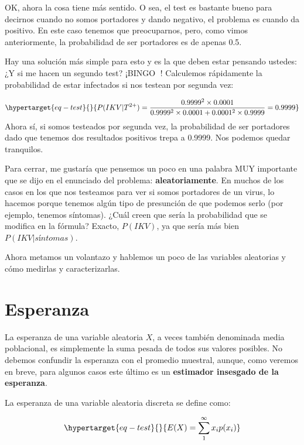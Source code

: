 \documentclass[
  letterpaper,
  DIV=11,
  numbers=noendperiod,
  oneside]{scrreprt}
\begin{document}
OK, ahora la cosa tiene más sentido. O sea, el test es bastante bueno
para decirnos cuando no somos portadores y dando negativo, el problema
es cuando da positivo. En este caso tenemos que preocuparnos, pero, como
vimos anteriormente, la probabilidad de ser portadores es de apenas 0.5.

Hay una solución más simple para esto y es la que deben estar pensando
ustedes: ¿Y si me hacen un segundo test? ¡BINGO 🎊! Calculemos
rápidamente la probabilidad de estar infectados si nos testean por
segunda vez:

\begin{equation}\protect\hypertarget{eq-test}{}{
P(IKV|T^{2+}) = \frac{0.9999^2 \times 0.0001}{0.9999^2 \times 0.0001 + 0.0001^2 \times 0.9999} = 0.9999
}\label{eq-test}\end{equation} Ahora sí, si somos testeados por segunda
vez, la probabilidad de ser portadores dado que tenemos dos resultados
positivos trepa a 0.9999. Nos podemos quedar tranquilos.

Para cerrar, me gustaría que pensemos un poco en una palabra MUY
importante que se dijo en el enunciado del problema:
\textbf{aleatoriamente}. En muchos de los casos en los que nos testeamos
para ver si somos portadores de un virus, lo hacemos porque tenemos
algún tipo de presunción de que podemos serlo (por ejemplo, tenemos
síntomas). ¿Cuál creen que sería la probabilidad que se modifica en la
fórmula? Exacto, \(P(IKV)\), ya que sería más bien \(P(IKV|síntomas)\).

Ahora metamos un volantazo y hablemos un poco de las variables
aleatorias y cómo medirlas y caracterizarlas.

\hypertarget{esperanza}{%
\section{Esperanza}\label{esperanza}}

La esperanza de una variable aleatoria \(X\), a veces también denominada
media poblacional, es simplemente la suma pesada de todos sus valores
posibles. No debemos confundir la esperanza con el promedio muestral,
aunque, como veremos en breve, para algunos casos este último es un
\textbf{estimador insesgado de la esperanza}.

La esperanza de una variable aleatoria discreta se define como:

\begin{equation}\protect\hypertarget{eq-test}{}{
E(X) = \sum_{1}^\infty x_i p(x_i)
}\label{eq-test}\end{equation}
\end{document}
